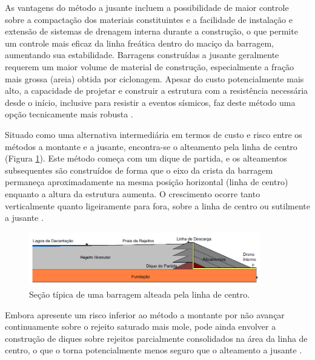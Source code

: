As vantagens do método a jusante incluem a possibilidade de maior controle sobre a compactação dos materiais constituintes e a facilidade de instalação e extensão de sistemas de drenagem interna durante a construção, o que permite um controle mais eficaz da linha freática dentro do maciço da barragem, aumentando sua estabilidade. Barragens construídas a jusante geralmente requerem um maior volume de material de construção, especialmente a fração mais grossa (areia) obtida por ciclonagem. Apesar do custo potencialmente mais alto, a capacidade de projetar e construir a estrutura com a resistência necessária desde o início, inclusive para resistir a eventos sísmicos, faz deste método uma opção tecnicamente mais robusta \cite{araujo2006, ibram2016}.


Situado como uma alternativa intermediária em termos de custo e risco entre os métodos a montante e a jusante, encontra-se o alteamento pela linha de centro (Figura \ref{fig:metodo_linha_de_centro}). Este método começa com um dique de partida, e os alteamentos subsequentes são construídos de forma que o eixo da crista da barragem permaneça aproximadamente na mesma posição horizontal (linha de centro) enquanto a altura da estrutura aumenta. O crescimento ocorre tanto verticalmente quanto ligeiramente para fora, sobre a linha de centro ou sutilmente a jusante \cite{soares2010, ctsufsj2017}.

\begin{figure}[!htb]
    \centering
    \includegraphics[width=0.9\textwidth]{figures/image20_linha_de_centro.png}
    \caption{Seção típica de uma barragem alteada pela linha de centro.}
    \label{fig:metodo_linha_de_centro}
\end{figure}

Embora apresente um risco inferior ao método a montante por não avançar continuamente sobre o rejeito saturado mais mole, pode ainda envolver a construção de diques sobre rejeitos parcialmente consolidados na área da linha de centro, o que o torna potencialmente menos seguro que o alteamento a jusante \cite{duarte2008}.

